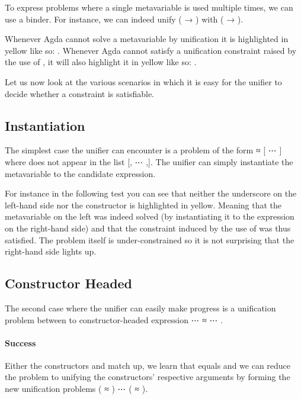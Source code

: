 
To express problems where a single metavariable is used multiple times,
we can use a  binder. For instance, we can indeed unify
{( → )} with {( → )}.


Whenever Agda cannot solve a metavariable by unification it is highlighted
in yellow like so: \AgdaUnsolvedMeta{\_}. Whenever Agda cannot satisfy a
unification constraint raised by the use of , it will also highlight
it in yellow like so: .

Let us now look at the various scenarios in which it is easy for the unifier
to decide whether a constraint is satisfiable.

\subsection{Instantiation}

The simplest case the unifier can encounter is a problem of the form
{ ≈ [ ⋯ ]} where  does not appear
in the list {[, ⋯ ,]}. The unifier can simply instantiate
the metavariable to the candidate expression.

For instance in the following test you can see that neither the underscore
on the left-hand side nor the  constructor is highlighted in yellow.
Meaning that the metavariable on the left was indeed solved (by instantiating
it to the expression on the right-hand side) and that the constraint induced
by the use of  was thus satisfied. The problem itself is
under-constrained so it is not surprising that the right-hand side lights up.


\subsection{Constructor Headed}

The second case where the unifier can easily make progress is a unification
problem between to constructor-headed expression
{  ⋯  ≈   ⋯ }.

\paragraph{Success} Either the constructors  and  match up, we learn
that  equals  and we can reduce the problem to unifying the constructors'
respective arguments by forming the new unification problems
{( ≈ ) ⋯ ( ≈ )}.

